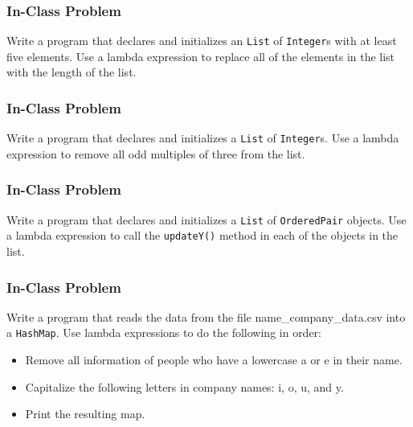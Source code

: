 \documentclass{beamer}
\newcommand{\mil}[1]{\texttt{#1}}
\begin{document}
\begin{frame}

    \frametitle{In-Class Problem}
    
    Write a program that declares and initializes an \mil{List} of \mil{Integer}s with at least five elements.  Use a lambda expression to replace all of the elements in the list with the length of the list.
    
\end{frame}

\begin{frame}

    \frametitle{In-Class Problem}
    
    Write a program that declares and initializes a \mil{List} of \mil{Integer}s.  Use a lambda expression to remove all odd multiples of three from the list.
    
\end{frame}

\begin{frame}

    \frametitle{In-Class Problem}
    
    Write a program that declares and initializes a \mil{List} of \mil{OrderedPair} objects.  Use a lambda expression to call the \mil{updateY()} method in each of the objects in the list.
    
\end{frame}

\begin{frame}[fragile]
    
    \frametitle{In-Class Problem}
    
    Write a program that reads the data from the file name\_company\_data.csv into a \mil{HashMap}.  Use lambda expressions to do the following in order:
    
    \begin{itemize}
    
        \item Remove all information of people who have a lowercase a or e in their name.
        \item Capitalize the following letters in company names: i, o, u, and y.
        \item Print the resulting map.
  
    \end{itemize}
    
\end{frame}
\end{document}
